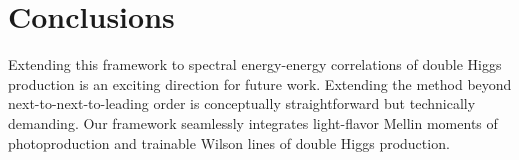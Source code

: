 \section{Conclusions}\label{sec:conclusions}

Extending this framework to spectral energy-energy correlations of
double Higgs production is an exciting direction for future work.
Extending the method beyond next-to-next-to-leading order is
conceptually straightforward but technically demanding. Our framework
seamlessly integrates light-flavor Mellin moments of photoproduction and
trainable Wilson lines of double Higgs production.

